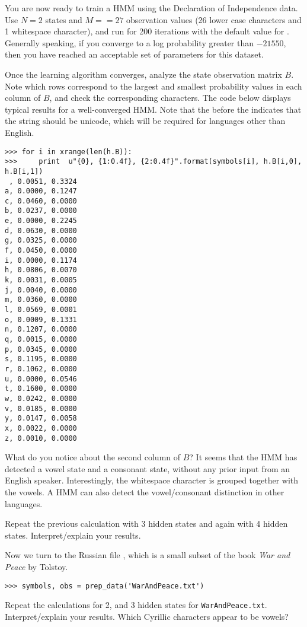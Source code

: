 \begin{problem}
You are now ready to train a HMM using the Declaration of Independence data.
Use $N=2$ states and $M=$$=27$ observation values (26 lower case characters and 1 whitespace character),
and run for 200 iterations with the default value for .
Generally speaking, if you converge to a log probability greater than $-21550$, then you have reached
an acceptable set of parameters for this dataset.

Once the learning algorithm converges, analyze the state observation matrix $B$.
Note which rows correspond to the largest and smallest probability values in each column of $B$,
and check the corresponding characters.
The code below displays typical results for a well-converged HMM.  Note that the  before the  indicates that the string should be unicode, which will be required for languages other than English.
\begin{lstlisting}
>>> for i in xrange(len(h.B)):
>>>     print  u"{0}, {1:0.4f}, {2:0.4f}".format(symbols[i], h.B[i,0], h.B[i,1])
 , 0.0051, 0.3324
a, 0.0000, 0.1247
c, 0.0460, 0.0000
b, 0.0237, 0.0000
e, 0.0000, 0.2245
d, 0.0630, 0.0000
g, 0.0325, 0.0000
f, 0.0450, 0.0000
i, 0.0000, 0.1174
h, 0.0806, 0.0070
k, 0.0031, 0.0005
j, 0.0040, 0.0000
m, 0.0360, 0.0000
l, 0.0569, 0.0001
o, 0.0009, 0.1331
n, 0.1207, 0.0000
q, 0.0015, 0.0000
p, 0.0345, 0.0000
s, 0.1195, 0.0000
r, 0.1062, 0.0000
u, 0.0000, 0.0546
t, 0.1600, 0.0000
w, 0.0242, 0.0000
v, 0.0185, 0.0000
y, 0.0147, 0.0058
x, 0.0022, 0.0000
z, 0.0010, 0.0000
\end{lstlisting}
What do you notice about the second column of $B$? It seems that the HMM has detected a vowel state and a consonant state, without any prior input from an English speaker.
Interestingly, the whitespace character is grouped together with the vowels. A HMM can also detect the vowel/consonant distinction in other languages.
\end{problem}

\begin{problem}
Repeat the previous calculation with 3 hidden states and again with 4 hidden states.  Interpret/explain your results.
\end{problem}


Now we turn to the Russian file , which is a small subset of the book \emph{War and Peace} by Tolstoy.
\begin{lstlisting}
>>> symbols, obs = prep_data('WarAndPeace.txt')
\end{lstlisting}

\begin{problem}
Repeat the calculations for 2, and 3 hidden states for \texttt{WarAndPeace.txt}.
Interpret/explain your results.  Which Cyrillic characters appear to be vowels?
\end{problem}
